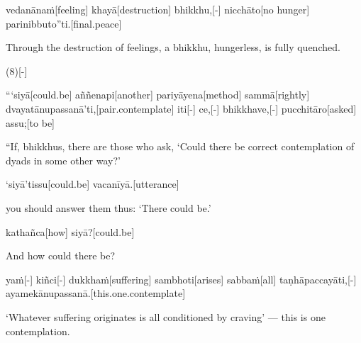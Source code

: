 \begin{samepage}
\begingl[glneveryline={\PaliGlossA,\PaliGlossB}]
vedanānaṁ[feeling] khayā[destruction] bhikkhu,[-] nicchāto[no hunger] parinibbuto”ti.[final.peace]
\endgl
\nopagebreak
\linespread{0.5}
\begin{spacin}{0.2}
{\PaliGlossFT Through the destruction of feelings, a bhikkhu, hungerless, is fully quenched.}
\end{spacin}
\vskip 12pt
\end{samepage}
\vskip 0.2in
\begin{samepage}
\begingl[glneveryline={\PaliGlossA,\PaliGlossB}]
(8)[-]
\endgl
\nopagebreak
\linespread{0.5}
\begin{spacin}{0.2}
{\PaliGlossFT [8. Craving]}
\end{spacin}
\vskip 12pt
\end{samepage}
\begin{samepage}
\begingl[glneveryline={\PaliGlossA,\PaliGlossB}]
“‘siyā[could.be] aññenapi[another] pariyāyena[method] sammā[rightly] dvayatānupassanā’ti,[pair.contemplate] iti[-] ce,[-] bhikkhave,[-] pucchitāro[asked] assu;[to be]
\endgl
\nopagebreak
\linespread{0.5}
\begin{spacin}{0.2}
{\PaliGlossFT “If, bhikkhus, there are those who ask, ‘Could there be correct contemplation of dyads in some other way?’}
\end{spacin}
\vskip 12pt
\end{samepage}
\begin{samepage}
\begingl[glneveryline={\PaliGlossA,\PaliGlossB}]
‘siyā’tissu[could.be] vacanīyā.[utterance]
\endgl
\nopagebreak
\linespread{0.5}
\begin{spacin}{0.2}
{\PaliGlossFT you should answer them thus: ‘There could be.’}
\end{spacin}
\vskip 12pt
\end{samepage}
\begin{samepage}
\begingl[glneveryline={\PaliGlossA,\PaliGlossB}]
kathañca[how] siyā?[could.be]
\endgl
\nopagebreak
\linespread{0.5}
\begin{spacin}{0.2}
{\PaliGlossFT And how could there be?}
\end{spacin}
\vskip 12pt
\end{samepage}
\begin{samepage}
\begingl[glneveryline={\PaliGlossA,\PaliGlossB}]
yaṁ[-] kiñci[-] dukkhaṁ[suffering] sambhoti[arises] sabbaṁ[all] taṇhāpaccayāti,[-] ayamekānupassanā.[this.one.contemplate]
\endgl
\nopagebreak
\linespread{0.5}
\begin{spacin}{0.2}
{\PaliGlossFT ‘Whatever suffering originates is all conditioned by craving’ — this is one contemplation.}
\end{spacin}
\vskip 12pt
\end{samepage}
